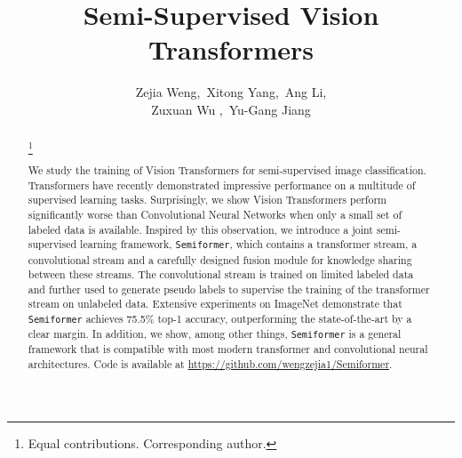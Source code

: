 \documentclass[runningheads]{llncs}
\makeatletter
\newcommand*{\system}{\texttt{Semiformer}\@\xspace}
\makeatother
\begin{document}
\pagestyle{headings}
\mainmatter
\def\ECCVSubNumber{3393}  \sloppy
\newcommand\blfootnote[1]{\begingroup
  \renewcommand\thefootnote{}\footnote{#1}\addtocounter{footnote}{-1}\endgroup
}


\title{Semi-Supervised Vision Transformers} 





\author{Zejia Weng,\, Xitong Yang,\, Ang Li, \\ Zuxuan Wu ,\, Yu-Gang Jiang
}


\maketitle

\begin{abstract}
\blfootnote{Equal contributions. Corresponding author.}
We study the training of Vision Transformers for semi-supervised image classification. Transformers have recently demonstrated impressive performance on a multitude of supervised learning tasks. Surprisingly, we show Vision Transformers perform significantly worse than Convolutional Neural Networks when only a small set of labeled data is available. Inspired by this observation, we introduce a joint semi-supervised learning framework, \system, which contains a transformer stream, a convolutional stream and a carefully designed fusion module for knowledge sharing between these streams. The convolutional stream is trained on limited labeled data and further used to generate pseudo labels to supervise the training of the transformer stream on unlabeled data. Extensive experiments on ImageNet demonstrate that \system achieves 75.5\% top-1 accuracy, outperforming the state-of-the-art by a clear margin. In addition, we show, among other things, \system is a general framework that is compatible with most modern transformer and convolutional neural architectures. Code is available at \href{https://github.com/wengzejia1/Semiformer}{https://github.com/wengzejia1/Semiformer}.


\end{abstract}
\end{document}
